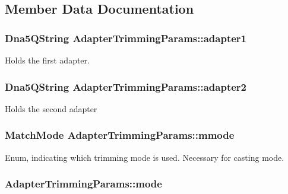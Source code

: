 \subsection{Member Data Documentation}
\hypertarget{struct_adapter_trimming_params_a2ce2d426a36e328f4fceb715910db488}{
\subsubsection[{adapter1}]{\setlength{\rightskip}{0pt plus 5cm}Dna5\-Q\-String Adapter\-Trimming\-Params\-::adapter1}}\label{struct_adapter_trimming_params_a2ce2d426a36e328f4fceb715910db488}
Holds the first adapter. \hypertarget{struct_adapter_trimming_params_aa7d555b99c145cd062e7caa12f4161ab}{
\subsubsection[{adapter2}]{\setlength{\rightskip}{0pt plus 5cm}Dna5\-Q\-String Adapter\-Trimming\-Params\-::adapter2}}\label{struct_adapter_trimming_params_aa7d555b99c145cd062e7caa12f4161ab}
Holds the second adapter \hypertarget{struct_adapter_trimming_params_ae69ec37f149e6b9234746ae275c5ff3e}{
\subsubsection[{mmode}]{\setlength{\rightskip}{0pt plus 5cm}Match\-Mode Adapter\-Trimming\-Params\-::mmode}}\label{struct_adapter_trimming_params_ae69ec37f149e6b9234746ae275c5ff3e}
Enum, indicating which trimming mode is used. Necessary for casting mode. \hypertarget{struct_adapter_trimming_params_a9e78ea3942b231eccb2243a70953c560}{
\subsubsection[{mode}]{ Adapter\-Trimming\-Params\-::mode}}\label{struct_adapter_trimming_params_a9e78ea3942b231eccb2243a70953c560}
